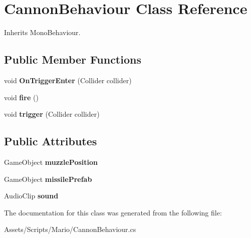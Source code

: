 \hypertarget{class_cannon_behaviour}{\section{Cannon\-Behaviour Class Reference}
\label{class_cannon_behaviour}
}


Inherits Mono\-Behaviour.

\subsection*{Public Member Functions}
\begin{DoxyCompactItemize}
\item 
\hypertarget{class_cannon_behaviour_a5494907b47648d6bda447e436840769f}{void {\bfseries On\-Trigger\-Enter} (Collider collider)}\label{class_cannon_behaviour_a5494907b47648d6bda447e436840769f}

\item 
\hypertarget{class_cannon_behaviour_a0d47659780e9cc9970ab4fc8efd532dc}{void {\bfseries fire} ()}\label{class_cannon_behaviour_a0d47659780e9cc9970ab4fc8efd532dc}

\item 
\hypertarget{class_cannon_behaviour_a2158d038e9d94534dd598822091ff6cb}{void {\bfseries trigger} (Collider collider)}\label{class_cannon_behaviour_a2158d038e9d94534dd598822091ff6cb}

\end{DoxyCompactItemize}
\subsection*{Public Attributes}
\begin{DoxyCompactItemize}
\item 
\hypertarget{class_cannon_behaviour_a79669dfca38049cf5294cbc5ea886e0f}{Game\-Object {\bfseries muzzle\-Position}}\label{class_cannon_behaviour_a79669dfca38049cf5294cbc5ea886e0f}

\item 
\hypertarget{class_cannon_behaviour_a482c857d7e68382047f4bdaf9a9f4a97}{Game\-Object {\bfseries missile\-Prefab}}\label{class_cannon_behaviour_a482c857d7e68382047f4bdaf9a9f4a97}

\item 
\hypertarget{class_cannon_behaviour_ab39d6634f159a05680d0ac20e72d347f}{Audio\-Clip {\bfseries sound}}\label{class_cannon_behaviour_ab39d6634f159a05680d0ac20e72d347f}

\end{DoxyCompactItemize}


The documentation for this class was generated from the following file\-:\begin{DoxyCompactItemize}
\item 
Assets/\-Scripts/\-Mario/Cannon\-Behaviour.\-cs\end{DoxyCompactItemize}

